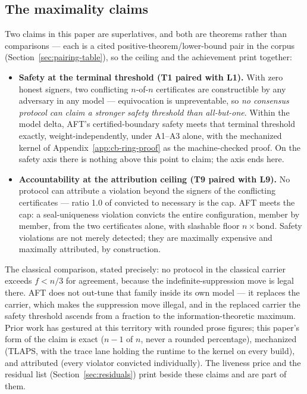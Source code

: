 \documentclass[11pt]{article}
\newcommand{\AFT}{\textsc{AFT}}
\begin{document}
\subsection{The maximality claims}
\label{sec:maximality}

Two claims in this paper are superlatives, and both are theorems rather
than comparisons --- each is a cited positive-theorem/lower-bound pair in
the corpus (Section~\ref{sec:pairing-table}), so the ceiling and the
achievement print together:

\begin{itemize}[leftmargin=1.5em]
\item \textbf{Safety at the terminal threshold (T1 paired with L1).}
With zero honest signers, two conflicting \(n\)-of-\(n\) certificates
are constructible by any adversary in any model --- equivocation is
unpreventable, so \emph{no consensus protocol can claim a stronger
safety threshold than all-but-one}. Within the model delta, \AFT{}'s
certified-boundary safety meets that terminal threshold exactly,
weight-independently, under A1--A3 alone, with the mechanized kernel of
Appendix~\ref{app:cb-ring-proof} as the machine-checked proof. On the
safety axis there is nothing above this point to claim; the axis ends
here.
\item \textbf{Accountability at the attribution ceiling (T9 paired with
L9).} No protocol can attribute a violation beyond the signers of the
conflicting certificates --- ratio 1.0 of convicted to necessary is the
cap. \AFT{} meets the cap: a seal-uniqueness violation convicts the
entire configuration, member by member, from the two certificates alone,
with slashable floor \(n \times \mathrm{bond}\). Safety violations are
not merely detected; they are maximally expensive and maximally
attributed, by construction.
\end{itemize}

The classical comparison, stated precisely: no protocol in the classical
carrier exceeds \(f < n/3\) for agreement, because the
indefinite-suppression move is legal there. \AFT{} does not out-tune
that family inside its own model --- it replaces the carrier, which
makes the suppression move illegal, and in the replaced carrier the
safety threshold ascends from a fraction to the information-theoretic
maximum. Prior work has gestured at this territory with rounded prose
figures; this paper's form of the claim is exact (\(n-1\) of \(n\),
never a rounded percentage), mechanized (TLAPS, with the trace lane
holding the runtime to the kernel on every build), and attributed (every
violator convicted individually). The liveness price and the residual
list (Section~\ref{sec:residuals}) print beside these claims and are
part of them.
\end{document}
